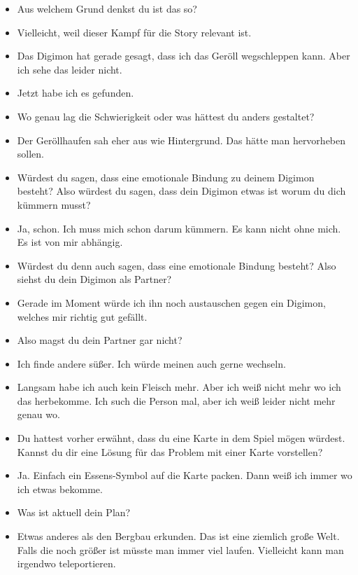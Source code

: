 {\begin{itemize}[]
    \item {} Aus welchem Grund denkst du ist das so?
    \item {} Vielleicht, weil dieser Kampf für die Story relevant ist.
    \item {} Das Digimon hat gerade gesagt, dass ich das Geröll wegschleppen kann. Aber ich sehe das leider nicht.
    \item {} Jetzt habe ich es gefunden.
    \item {} Wo genau lag die Schwierigkeit oder was hättest du anders gestaltet?
    \item {} Der Geröllhaufen sah eher aus wie Hintergrund. Das hätte man hervorheben sollen.
    \item {} Würdest du sagen, dass eine emotionale Bindung zu deinem Digimon besteht? Also würdest du sagen, dass dein Digimon etwas ist worum du dich kümmern musst?
    \item {} Ja, schon. Ich muss mich schon darum kümmern. Es kann nicht ohne mich. Es ist von mir abhängig.
    \item {} Würdest du denn auch sagen, dass eine emotionale Bindung besteht? Also siehst du dein Digimon als Partner?
    \item {} Gerade im Moment würde ich ihn noch austauschen gegen ein Digimon, welches mir richtig gut gefällt. 
    \item {} Also magst du dein Partner gar nicht?
    \item {} Ich finde andere süßer. Ich würde meinen auch gerne wechseln.
    \item {} Langsam habe ich auch kein Fleisch mehr. Aber ich weiß nicht mehr wo ich das herbekomme. Ich such die Person mal, aber ich weiß leider nicht mehr genau wo.
    \item {} Du hattest vorher erwähnt, dass du eine Karte in dem Spiel mögen würdest. Kannst du dir eine Lösung für das Problem mit einer Karte vorstellen?
    \item {} Ja. Einfach ein Essens-Symbol auf die Karte packen. Dann weiß ich immer wo ich etwas bekomme.
    \item {} Was ist aktuell dein Plan?
    \item {} Etwas anderes als den Bergbau erkunden. Das ist eine ziemlich große Welt. Falls die noch größer ist müsste man immer viel laufen. Vielleicht kann man irgendwo teleportieren.

\end{itemize}}
